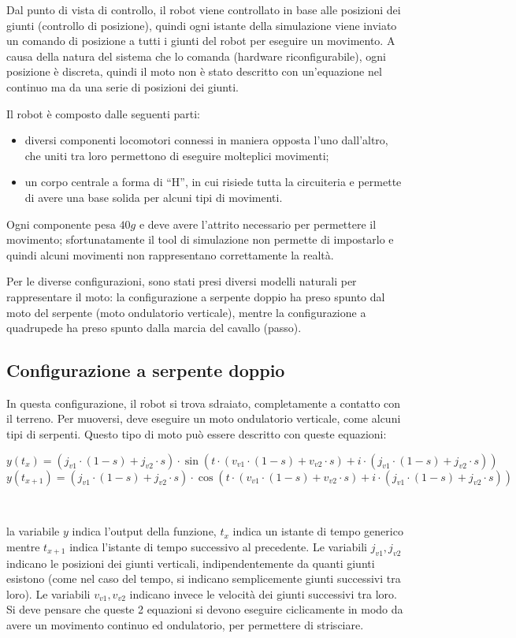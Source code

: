 \documentclass[a4paper,titlepage]{book}
\begin{document}
Dal punto di vista di controllo, il robot viene controllato in base alle posizioni dei giunti (controllo di posizione), quindi ogni istante della simulazione viene inviato un comando di posizione a tutti i giunti del robot per eseguire un movimento.
A causa della natura del sistema che lo comanda (hardware riconfigurabile), ogni posizione è discreta, quindi il moto non è stato descritto con un'equazione nel continuo ma da una serie di posizioni dei giunti.

Il robot è composto dalle seguenti parti:
\begin{itemize}
  \item diversi componenti locomotori connessi in maniera opposta l'uno dall'altro, che uniti tra loro permettono di eseguire molteplici movimenti;
  \item un corpo centrale a forma di ``H'', in cui risiede tutta la circuiteria e permette di avere una base solida per alcuni tipi di movimenti.
\end{itemize}

Ogni componente pesa $40g$ e deve avere l'attrito necessario per permettere il movimento; sfortunatamente il tool di simulazione non permette di impostarlo e quindi alcuni movimenti non rappresentano correttamente la realtà.

Per le diverse configurazioni, sono stati presi diversi modelli naturali per rappresentare il moto: la configurazione a serpente doppio ha preso spunto dal moto del serpente (moto ondulatorio verticale), mentre la configurazione a quadrupede ha preso spunto dalla marcia del cavallo (passo).

\subsection{Configurazione a serpente doppio}

In questa configurazione, il robot si trova sdraiato, completamente a contatto con il terreno. Per muoversi, deve eseguire un moto ondulatorio verticale, come alcuni tipi di serpenti. Questo tipo di moto può essere descritto con queste equazioni:

$$ y(t_{x}) = (j_{v1} \cdot (1-s)+j_{v2} \cdot s) \cdot \sin(t \cdot (v_{v1} \cdot (1-s)+v_{v2} \cdot s)+i \cdot (j_{v1} \cdot (1-s)+j_{v2} \cdot s)) $$
$$ y(t_{x+1}) = (j_{v1} \cdot (1-s)+j_{v2} \cdot s) \cdot \cos(t \cdot (v_{v1} \cdot (1-s)+v_{v2} \cdot s)+i \cdot (j_{v1} \cdot (1-s)+j_{v2} \cdot s)) $$

~

la variabile $ y $ indica l'output della funzione, $ t_{x} $ indica un istante di tempo generico mentre $ t_{x+1} $ indica l'istante di tempo successivo al precedente. Le variabili $ j_{v1}, j_{v2} $ indicano le posizioni dei giunti verticali, indipendentemente da quanti giunti esistono (come nel caso del tempo, si indicano semplicemente giunti successivi tra loro).  Le variabili $ v_{v1}, v_{v2} $ indicano invece le velocità dei giunti successivi tra loro.
Si deve pensare che queste 2 equazioni si devono eseguire ciclicamente in modo da avere un movimento continuo ed ondulatorio, per permettere di strisciare.
\end{document}
